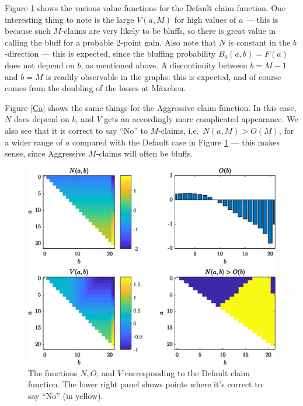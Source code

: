 \documentclass[12pt]{article}
\begin{document}
Figure \ref{C0} shows the various value functions for the Default claim function. One interesting thing to note is the large $V(a,M)$ for high values of $a$ --- this is because such $M$-claims are very likely to be bluffs, so there is great value in calling the bluff for a probable 2-point gain. Also note that $N$ is constant in the $b$-direction --- this is expected, since the bluffing probability $B_0(a,b) = F(a)$ does not depend on $b$, as mentioned above. A discontinuity between $b = M-1$ and $b = M$ is readily observable in the graphs: this is expected, and of course comes from the doubling of the losses at M\"{a}xchen.

Figure \ref{Ca} shows the same things for the Aggressive claim function. In this case, $N$ does depend on $b$, and $V$ gets an accordingly more complicated appearance. We also see that it is correct to say ``No'' to $M$-claims, i.e.\ $N(a,M) > O(M)$, for a wider range of $a$ compared with the Default case in Figure \ref{C0} --- this makes sense, since Aggressive $M$-claims will often be bluffs.

\begin{figure}
  \includegraphics[width=\linewidth]{valueD.eps}
  \caption{The functions $N, O$, and $V$ corresponding to the Default claim function. The lower right panel shows points where it's correct to say ``No'' (in yellow).}
  \label{C0}
\end{figure}
\end{document}
